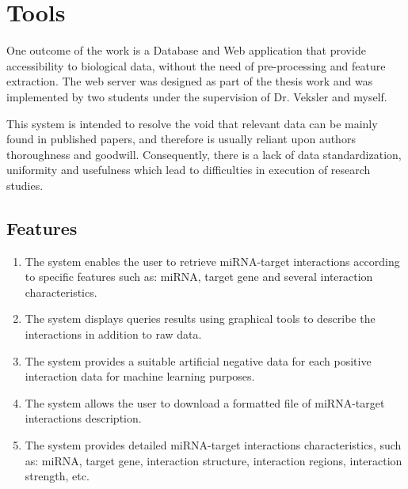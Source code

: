 \chapter{Tools}
\label{chap:tools}
One outcome of the work is a Database and Web application that provide accessibility to biological data, without the need of pre-processing and feature extraction. 
The web server was designed as part of the thesis work and was implemented by two students under the supervision of Dr. Veksler and myself.

This system is intended to resolve the void that relevant data can be mainly found in published papers, and therefore is usually reliant upon authors thoroughness and goodwill. Consequently, there is a lack of data standardization, uniformity and usefulness which lead to difficulties in execution of research studies.

\section{Features}
\begin{enumerate}
\item The system enables the user to retrieve miRNA-target interactions according to specific features such as: miRNA, target gene and several interaction characteristics.
\item The system displays queries results using graphical tools to describe the interactions in addition to raw data. 
\item The system provides a suitable artificial negative data for each positive interaction data for machine learning purposes.
\item The system allows the user to download a formatted file of miRNA-target interactions description.
\item The system provides detailed miRNA-target interactions characteristics, such as: miRNA, target gene, interaction structure, interaction regions, interaction strength, etc.
\end{enumerate}

